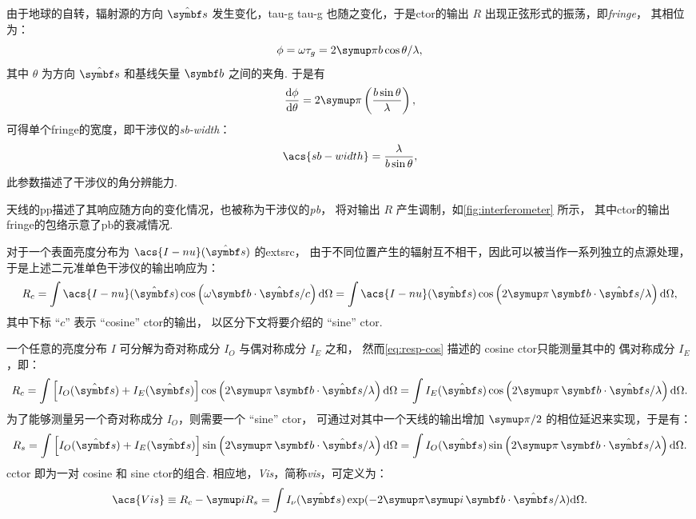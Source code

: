 由于地球的自转，辐射源的方向 $\hat{\B{s}}$ 发生变化，\acl{tau-g} \acs{tau-g}
也随之变化，于是\ac{ctor}的输出 $R$ 出现正弦形式的振荡，即\emph{\acf{fringe}}，
其相位为：
\begin{equation}
  \phi = \omega\tau_g = 2\Cpi b \cos\theta / \lambda,
\end{equation}
其中 $\theta$ 为方向 $\hat{\B{s}}$ 和基线矢量 $\B{b}$ 之间的夹角.
于是有
\begin{equation}
  \diff{\phi}{\theta} = 2\Cpi \left( \frac{b \sin\theta}{\lambda} \right),
\end{equation}
可得单个\ac{fringe}的宽度，即干涉仪的\emph{\acf{sb-width}}：
\begin{equation}
  \label{eq:sb-width}
  \acs{sb-width} = \frac{\lambda}{b \sin\theta},
\end{equation}
此参数描述了干涉仪的角分辨能力.

天线的\ac{pp}描述了其响应随方向的变化情况，也被称为干涉仪的\emph{\acf{pb}}，
将对输出 $R$ 产生调制，如\autoref{fig:interferometer} 所示，
其中\ac{ctor}的输出\ac{fringe}的包络示意了\ac{pb}的衰减情况.

对于一个表面亮度分布为 $\acs{I-nu}(\hat{\B{s}})$ 的\ac{extsrc}，
由于不同位置产生的辐射互不相干，因此可以被当作一系列独立的点源处理，
于是上述二元准单色干涉仪的输出响应为：
\begin{equation}
  \label{eq:resp-cos}
  R_c = \int \acs{I-nu}(\hat{\B{s}}) \cos \left(
      \omega \B{b}\cdot\hat{\B{s}} / c \right) \D{\Omega}
    = \int \acs{I-nu}(\hat{\B{s}}) \cos \left(
      2\Cpi\, \B{b}\cdot\hat{\B{s}} / \lambda \right) \D{\Omega},
\end{equation}
其中下标 \enquote{$c$} 表示 \enquote{cosine} \ac{ctor}的输出，
以区分下文将要介绍的 \enquote{sine} \ac{ctor}.

一个任意的亮度分布 $I$ 可分解为奇对称成分 $I_O$ 与偶对称成分 $I_E$ 之和，
然而\autoref{eq:resp-cos} 描述的 cosine \ac{ctor}只能测量其中的
偶对称成分 $I_E$，即：
\begin{equation}
  R_c = \int \left[ I_O(\hat{\B{s}}) + I_E(\hat{\B{s}}) \right]
      \cos \left( 2\Cpi\, \B{b}\cdot\hat{\B{s}} / \lambda \right)
      \D{\Omega}
    = \int I_E(\hat{\B{s}}) \cos \left(
      2\Cpi\, \B{b}\cdot\hat{\B{s}} / \lambda \right) \D{\Omega}.
\end{equation}
为了能够测量另一个奇对称成分 $I_O$，则需要一个 \enquote{sine} \ac{ctor}，
可通过对其中一个天线的输出增加 $\Cpi/2$ 的相位延迟来实现，于是有：
\begin{equation}
  R_s = \int \left[ I_O(\hat{\B{s}}) + I_E(\hat{\B{s}}) \right]
      \sin \left( 2\Cpi\, \B{b}\cdot\hat{\B{s}} / \lambda \right)
      \D{\Omega}
    = \int I_O(\hat{\B{s}}) \sin \left(
      2\Cpi\, \B{b}\cdot\hat{\B{s}} / \lambda \right) \D{\Omega}.
\end{equation}
\ac{cctor} 即为一对 cosine 和 sine \ac{ctor}的组合.
相应地，\emph{\acf{Vis}}，简称\emph{\ac{vis}}，可定义为：
\begin{equation}
  \label{eq:vis}
  \acs{Vis} \equiv R_c - \Ci R_s
    = \int I_{\nu}(\hat{\B{s}}) \exp
      (-2\Cpi\Ci\, \B{b}\cdot\hat{\B{s}} / \lambda) \D{\Omega}.
\end{equation}

